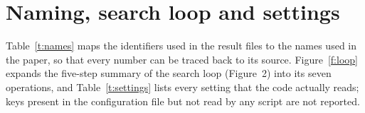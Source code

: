 \documentclass{sadhana}
\begin{document}
\corres
\volnum{}
\issuenum{}
\monthyear{}
\pgfirst{}
\pglast{}
\doinum{}
\articleType{}

\onecolumn

\section{Naming, search loop and settings}\label{s:loop}

Table~\ref{t:names} maps the identifiers used in the result files to the names used in the paper, so that every number can be traced back to its source. Figure~\ref{f:loop} expands the five-step summary of the search loop (Figure~2) into its seven operations, and Table~\ref{t:settings} lists every setting that the code actually reads; keys present in the configuration file but not read by any script are not reported.
\end{document}
